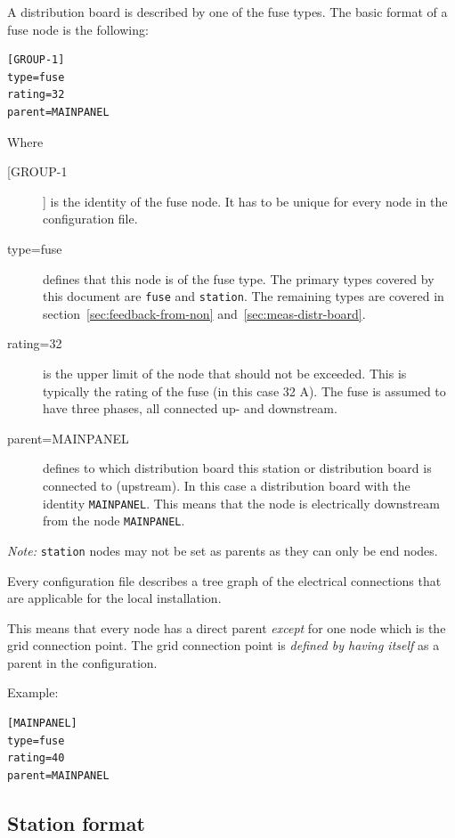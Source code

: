 \documentclass[10pt,a4paper,oneside,headings=big,headsepline]{scrreprt}
\begin{document}
A distribution board is described by one of the fuse types. The basic format
of a fuse node is the following:

\begin{verbatim}
[GROUP-1]
type=fuse
rating=32
parent=MAINPANEL
\end{verbatim}

Where

\begin{description}
\item [[GROUP-1]] is the identity of the fuse node. It has to be unique for
  every node in the configuration file.

\item [type=fuse] defines that this node is of the fuse type. The primary
  types covered by this document are \verb|fuse| and \verb|station|. The
  remaining types are covered in section~\ref{sec:feedback-from-non}
  and~\ref{sec:meas-distr-board}.

\item [rating=32] is the upper limit of the node that should not be
  exceeded. This is typically the rating of the fuse (in this case 32
  A). The fuse is assumed to have three phases, all connected up- and
  downstream.

\item [parent=MAINPANEL] defines to which distribution board this station or
  distribution board is connected to (upstream). In this case a distribution
  board with the identity \verb|MAINPANEL|. This means that the node is
  electrically downstream from the node \verb|MAINPANEL|.
\end{description}

\emph{Note:} \verb|station| nodes may not be set as parents as they can only be
end nodes.

Every configuration file describes a tree graph of the electrical
connections that are applicable for the local installation.

This means that every node has a direct parent \emph{except} for one node
which is the grid connection point. The grid connection point is \emph{defined
  by having itself} as a parent in the configuration.

Example:

\begin{verbatim}
[MAINPANEL]
type=fuse
rating=40
parent=MAINPANEL
\end{verbatim}


\subsection{Station format}
\label{sec:station-format}
\end{document}
